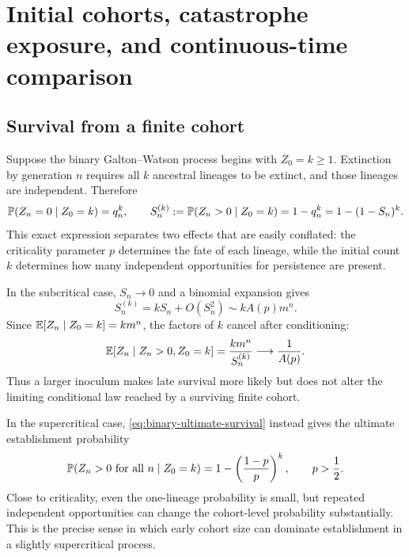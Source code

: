 \section{Initial cohorts, catastrophe exposure, and continuous-time comparison}
\label{sec:cohorts}

\subsection{Survival from a finite cohort}
\label{sec:k-ancestors}

Suppose the binary Galton--Watson process begins with $Z_0=k\ge1$.  Extinction by generation $n$ requires all $k$ ancestral lineages to be extinct, and those lineages are independent.  Therefore
\begin{equation}
  \mathbb{P}(Z_n=0\mid Z_0=k)=q_n^k,
  \qquad
  S_n^{(k)}
  :=\mathbb{P}(Z_n>0\mid Z_0=k)
  =1-q_n^k
  =1-(1-S_n)^k.
  \label{eq:k-lineage-survival}
\end{equation}
This exact expression separates two effects that are easily conflated: the criticality parameter $p$ determines the fate of each lineage, while the initial count $k$ determines how many independent opportunities for persistence are present.

In the subcritical case, $S_n\to0$ and a binomial expansion gives
\begin{equation}
  S_n^{(k)}
  =kS_n+O(S_n^2)
  \sim kA(p)m^n.
  \label{eq:k-subcritical-asymptotic}
\end{equation}
Since $\mathbb{E}[Z_n\mid Z_0=k]=km^n$, the factors of $k$ cancel after conditioning:
\begin{equation}
  \mathbb{E}[Z_n\mid Z_n>0,Z_0=k]
  =\frac{km^n}{S_n^{(k)}}
  \longrightarrow \frac{1}{A(p)}.
  \label{eq:k-yaglom-mean}
\end{equation}
Thus a larger inoculum makes late survival more likely but does not alter the limiting conditional law reached by a surviving finite cohort.

In the supercritical case, \cref{eq:binary-ultimate-survival} instead gives the ultimate establishment probability
\begin{equation}
  \mathbb{P}(Z_n>0\text{ for all }n\mid Z_0=k)
  =1-\left(\frac{1-p}{p}\right)^k,
  \qquad p>\frac12.
  \label{eq:k-ultimate-establishment}
\end{equation}
Close to criticality, even the one-lineage probability is small, but repeated independent opportunities can change the cohort-level probability substantially.  This is the precise sense in which early cohort size can dominate establishment in a slightly supercritical process.

